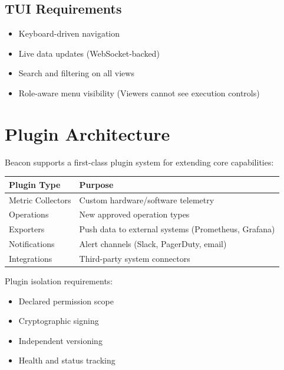 \documentclass[12pt,a4paper]{article}
\begin{document}
\subsection{TUI Requirements}

\begin{itemize}[noitemsep]
    \item Keyboard-driven navigation
    \item Live data updates (WebSocket-backed)
    \item Search and filtering on all views
    \item Role-aware menu visibility (Viewers cannot see execution controls)
\end{itemize}

\section{Plugin Architecture}

Beacon supports a first-class plugin system for extending core capabilities:

\begin{center}
\begin{tabular}{ll}
\toprule
Plugin Type & Purpose \\
\midrule
Metric Collectors & Custom hardware/software telemetry \\
Operations        & New approved operation types \\
Exporters         & Push data to external systems (Prometheus, Grafana) \\
Notifications     & Alert channels (Slack, PagerDuty, email) \\
Integrations      & Third-party system connectors \\
\bottomrule
\end{tabular}
\end{center}

Plugin isolation requirements:

\begin{itemize}[noitemsep]
    \item Declared permission scope
    \item Cryptographic signing
    \item Independent versioning
    \item Health and status tracking
\end{itemize}
\end{document}

